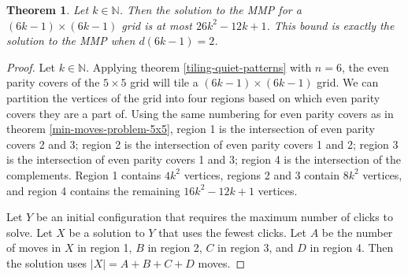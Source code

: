 \documentclass[a4paper]{article}
\newtheorem{theorem}{Theorem}
\newcommand{\N}{\mathbb{N}}
\newcommand{\abs}[1]{\left| #1 \right|}
\begin{document}
	\begin{theorem}\label{min-moves-problem-6k-1x6k-1}
		Let $k \in \N$.
		Then the solution to the MMP for a $(6k - 1) \times (6k - 1)$ grid is at most $26k^2 - 12k + 1$.
		This bound is exactly the solution to the MMP when $d(6k-1)=2$.
	\end{theorem}
	\begin{proof}
		Let $k \in \N$.
		Applying theorem \ref{tiling-quiet-patterns} with $n=6$, the even parity covers of the $5 \times 5$ grid will tile a $(6k - 1) \times (6k - 1)$ grid.
		We can partition the vertices of the grid into four regions based on which even parity covers they are a part of.
		Using the same numbering for even parity covers as in theorem \ref{min-moves-problem-5x5}, region 1 is the intersection of even parity covers 2 and 3; region 2 is the intersection of even parity covers 1 and 2; region 3 is the intersection of even parity covers 1 and 3; region 4 is the intersection of the complements.
		Region 1 contains $4k^2$ vertices, regions 2 and 3 contain $8k^2$ vertices, and region 4 contains the remaining $16k^2 - 12k + 1$ vertices.
		
		Let $Y$ be an initial configuration that requires the maximum number of clicks to solve.
		Let $X$ be a solution to $Y$ that uses the fewest clicks.
		Let $A$ be the number of moves in $X$ in region 1, $B$ in region 2, $C$ in region 3, and $D$ in region 4.
		Then the solution uses $\abs{X} = A + B + C + D$ moves.
		

\end{proof}
\end{document}
